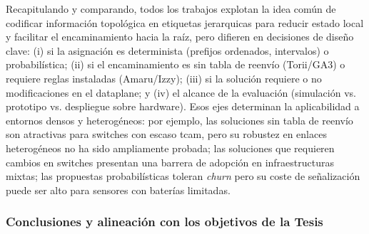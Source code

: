 Recapitulando y comparando, todos los trabajos explotan la idea común de codificar información topológica en etiquetas jerarquicas para reducir estado local y facilitar el encaminamiento hacia la raíz, pero difieren en decisiones de diseño clave: (i) si la asignación es determinista (prefijos ordenados, intervalos) o probabilística; (ii) si el encaminamiento es sin tabla de reenvío (Torii/GA3) o requiere reglas instaladas (Amaru/Izzy); (iii) si la solución requiere o no modificaciones en el dataplane; y (iv) el alcance de la evaluación (simulación vs. prototipo vs. despliegue sobre hardware). Esos ejes determinan la aplicabilidad a entornos densos y heterogéneos: por ejemplo, las soluciones sin tabla de reenvío son atractivas para switches con escaso \gls{tcam}, pero su robustez en enlaces heterogéneos no ha sido ampliamente probada; las soluciones que requieren cambios en switches presentan una barrera de adopción en infraestructuras mixtas; las propuestas probabilísticas toleran \textit{churn} pero su coste de señalización puede ser alto para sensores con baterías limitadas.

\subsubsection{Conclusiones y alineación con los objetivos de la Tesis}

